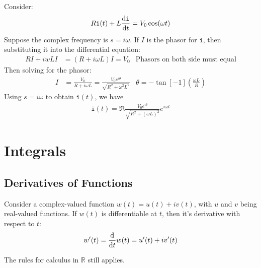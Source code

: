 \documentclass[12pt, english]{book}
\begin{document}
	\begin{example}
		Consider:
		\begin{align*}
			R\mathtt{i}(t) + L \dv{\mathtt{i}}{t} = V_0 \cos(\omega t)
		\end{align*}
		Suppose the complex frequency is \(s = i\omega\). If \(I\) is the phasor for \(\mathtt{i}\), then substituting it into the differential equation:
		\begin{align*}
			RI + iwLI &= (R + i \omega L)I = V_0 & \text{Phasors on both side must equal}
		\end{align*}
		Then solving for the phasor:
		\begin{align*}
			I &= \frac{V_0}{R + i\omega L} = \frac{V_0 e^{i\theta}}{\sqrt{R^2 + \omega^2 L^2}} & \theta = - \tan[-1](\frac{\omega L}{R}) 
		\end{align*}
		Using \(s = i\omega\) to obtain \(\mathtt{i}(t)\), we have
		\begin{align*}
			\mathtt{i}(t) = \Re{\frac{V_0 e^{i\theta}}{\sqrt{R^2 + (\omega L)^2}}e^{i\omega t}}
		\end{align*}
	\end{example}

	\chapter{Integrals} \label{Integrals Chapter - Complex}
	
	\section{Derivatives of Functions} \label{Derivatives of Functions Section - Complex}
	
	\begin{definition}
		\label{Derivative of Complex-Valued Function Definition - Complex}
		Consider a complex-valued function \(w(t) = u(t) + iv(t)\), with \(u\) and \(v\) being real-valued functions. If \(w(t)\) is differentiable at \(t\), then it's derivative with respect to \(t\):
		\begin{align*}
			w'(t) = \dv{t} w(t) = u'(t) + iv'(t)
		\end{align*}
	\end{definition}
	The rules for calculus in \(\mathbb{R}\) still applies.
	
\end{document}
